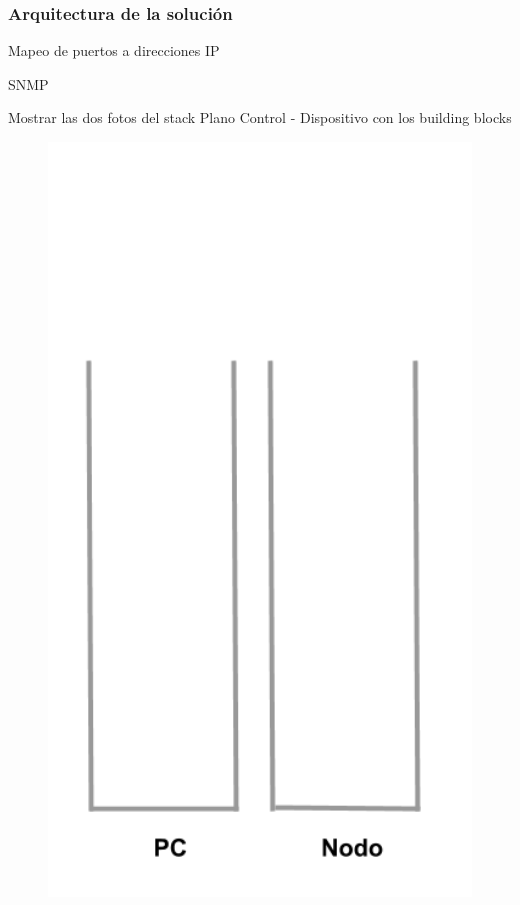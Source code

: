 \documentclass{beamer}
\begin{document}
\begin{frame}
\frametitle{Arquitectura de la soluci\'on} 

\begin{minipage}{0.60\textwidth}
Mapeo de puertos a direcciones IP

SNMP

Mostrar las dos fotos del stack Plano Control - Dispositivo con los building blocks
\end{minipage}
\hfill
\begin{minipage}{0.30\textwidth}
\begin{figure}[H]
\raggedright
\includegraphics[width=1.0\textwidth, right]{imagenes/Stack.png}
\end{figure}
\end{minipage} 


\end{frame}
\end{document}

